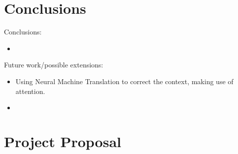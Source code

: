 \documentclass[a4paper, 12pt]{report}
\begin{document}
\chapter{Conclusions}

Conclusions:
\begin{itemize}
\item
	
\end{itemize}

Future work/possible extensions:
\begin{itemize}
\item
	Using Neural Machine Translation to correct the context, making use of attention.
\item
	
\end{itemize}




\appendix

\chapter{Project Proposal}
\end{document}
